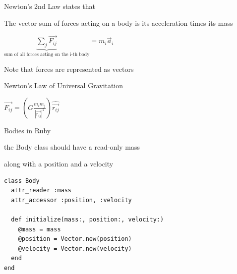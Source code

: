 \documentclass[bigger]{beamer}
\begin{document}
\begin{frame}[label=sec-23]{Newton's 2nd Law states that}
\begin{block}{The vector sum of forces acting on a body is its acceleration times its mass}
\begin{center}
{\LARGE $\underbrace{\sum_j\vec{F_{ij}}}_\text{sum of all forces acting on the i-th body} = m_i\vec{a}_i$ }
\end{center}
\end{block}

\begin{block}{Note that forces are represented as vectors}
\end{block}
\end{frame}

\begin{frame}[label=sec-24]{Newton's Law of Universal Gravitation}
\begin{center}
\end{center}

\begin{center}
{\LARGE $\vec{F_{ij}} = \left(G \frac{m_i m_j}{ |\vec{r_{ij}}|^2 }\right)\hat{\vec{r_{ij}}}$ }
\end{center}
\end{frame}

\begin{frame}[fragile,label=sec-25]{Bodies in Ruby}
 \begin{block}{the Body class should have a read-only mass}
\end{block}
\begin{block}{along with a position and a velocity}
\begin{verbatim}
class Body
  attr_reader :mass
  attr_accessor :position, :velocity

  def initialize(mass:, position:, velocity:)
    @mass = mass
    @position = Vector.new(position)
    @velocity = Vector.new(velocity)
  end
end
\end{verbatim}
\end{block}
\end{frame}
\end{document}

